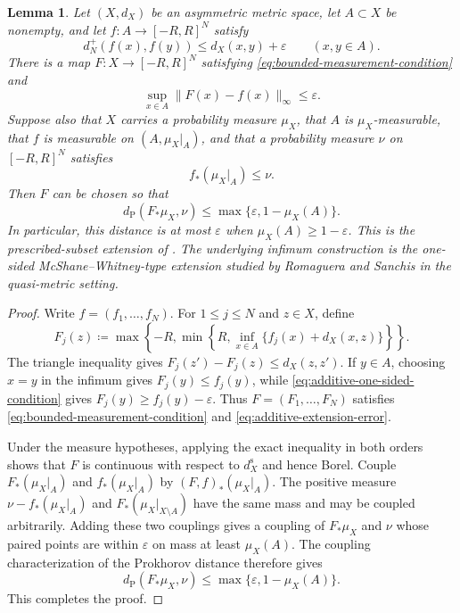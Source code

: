 \documentclass{amsart}
\numberwithin{equation}{section}
\theoremstyle{plain}
\newtheorem{lemma}[theorem]{Lemma}
\theoremstyle{definition}
\theoremstyle{remark}
\newcommand{\eps}{\varepsilon}
\begin{document}
\begin{lemma}\label{lem:one-sided-extension}
Let $(X,d_X)$ be an asymmetric metric space, let $A\subset X$ be nonempty, and let $f\colon A\to[-R,R]^N$ satisfy
\begin{equation}\label{eq:additive-one-sided-condition} d_N^+(f(x),f(y))\le d_X(x,y)+\eps \qquad(x,y\in A). \end{equation}
There is a map $F\colon X\to[-R,R]^N$ satisfying \eqref{eq:bounded-measurement-condition} and
\begin{equation}\label{eq:additive-extension-error} \sup_{x\in A}\lVert F(x)-f(x)\rVert_\infty\le\eps. \end{equation}
Suppose also that $X$ carries a probability measure $\mu_X$, that $A$ is $\mu_X$-measurable, that $f$ is measurable on $(A,\mu_X|_A)$, and that a probability measure $\nu$ on $[-R,R]^N$ satisfies
\begin{equation}\label{eq:extension-submeasure} f_*(\mu_X|_A)\le\nu. \end{equation}
Then $F$ can be chosen so that
\begin{equation}\label{eq:extension-prokhorov-bound} d_{\mathrm P}(F_*\mu_X,\nu)\le\max\{\eps,1-\mu_X(A)\}. \end{equation}
In particular, this distance is at most $\eps$ when $\mu_X(A)\ge1-\eps$.
This is the prescribed-subset extension of \cite[Lemma~3.10]{one-sided-pyramids}.
The underlying infimum construction is the one-sided McShane--Whitney-type extension studied by Romaguera and Sanchis \cite{romaguera2000semi} in the quasi-metric setting.
\end{lemma}

\begin{proof}
Write $f=(f_1,\ldots,f_N)$.  For $1\le j\le N$ and $z\in X$, define
\[ F_j(z)\coloneqq\max\left\{-R,\min\left\{R,\inf_{x\in A}\{f_j(x)+d_X(x,z)\}\right\}\right\}. \]
The triangle inequality gives $F_j(z')-F_j(z)\le d_X(z,z')$.  If $y\in A$, choosing $x=y$ in the infimum gives $F_j(y)\le f_j(y)$, while \eqref{eq:additive-one-sided-condition} gives $F_j(y)\ge f_j(y)-\eps$.  Thus $F=(F_1,\ldots,F_N)$ satisfies \eqref{eq:bounded-measurement-condition} and \eqref{eq:additive-extension-error}.

Under the measure hypotheses, applying the exact inequality in both orders shows that $F$ is continuous with respect to $d_X^{\mathrm s}$ and hence Borel.  Couple $F_*(\mu_X|_A)$ and $f_*(\mu_X|_A)$ by $(F,f)_*(\mu_X|_A)$.  The positive measure $\nu-f_*(\mu_X|_A)$ and $F_*(\mu_X|_{X\setminus A})$ have the same mass and may be coupled arbitrarily.  Adding these two couplings gives a coupling of $F_*\mu_X$ and $\nu$ whose paired points are within $\eps$ on mass at least $\mu_X(A)$.  The coupling characterization of the Prokhorov distance therefore gives
\[ d_{\mathrm P}(F_*\mu_X,\nu)\le\max\{\eps,1-\mu_X(A)\}. \]
This completes the proof.
\end{proof}
\end{document}
